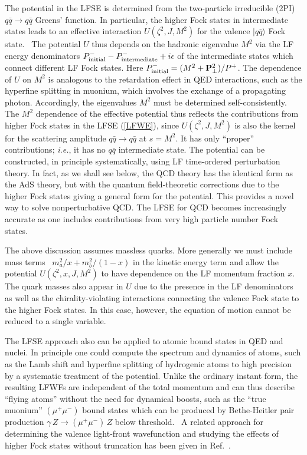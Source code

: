 \documentclass[prd,aps,onecolumn,nofootinbib]{revtex4}
\begin{document}
The potential in the LFSE is determined from the two-particle irreducible (2PI) $ q \bar q \to q \bar q $ Greens' function.  In particular, the higher Fock states in intermediate states
leads to an effective interaction $U(\zeta^2, J ,M^2)$  for the valence $\vert q \bar q \rangle$ Fock state.~\cite{Pauli:1998tf}
The potential $U$ thus depends on the hadronic eigenvalue $M^2$ via the LF energy denominators 
$P^-_{\rm initial} - P^-_{\rm intermediate} + i \epsilon$
of the intermediate states which connect different LF Fock states.  
Here $P^-_{\rm initial} =( {M^2 + \mathbf{P}^2_\perp)/ P^+}$. The dependence of $U$ on $M^2$ is analogous to the retardation effect in QED interactions, such as the hyperfine splitting in muonium, which involves the exchange of a propagating photon.  Accordingly, the eigenvalues $M^2$ must be determined 
self-consistently.~\cite{deTeramond:2012cs} 
The  $M^2$ dependence of the effective potential thus reflects the contributions from higher Fock states in the LFSE (\ref{LFWE}),  since
 $U(\zeta^2, J ,M^2)$ is also the kernel for the  scattering amplitude $q \bar q \to q \bar q$ at $s = M^2.$    It has only ``proper'' contributions; {\it i.e.}, it has no $q \bar q$ intermediate state.  The potential can be constructed, in principle systematically, using LF time-ordered perturbation theory.  In fact, as we shall see below, the QCD theory has the identical form as the AdS theory, but with the quantum field-theoretic corrections due to the higher Fock states giving a general form for the potential.  This provides a novel way to solve nonperturbative QCD.  The LFSE for QCD becomes increasingly accurate as one includes contributions from very high particle number Fock states. 

 
The above discussion assumes massless quarks. More generally we must include mass terms~\cite{Brodsky:2008pg,Gutsche:2011uj}
${m^2_a / x}  + {m^2_b/(1-x)}$ in the kinetic energy term and allow  the potential $  U(\zeta^2, x, J,M^2)$ to have dependence on the LF momentum fraction $x$.  The quark masses also appear in $U$ due to the  presence in the LF denominators as well as the chirality-violating interactions connecting the valence Fock state to the higher Fock states. In this case, however, the equation of motion cannot be reduced to a single variable.

The LFSE approach also can be applied to atomic bound states in QED and nuclei. In principle one could compute the spectrum and dynamics of atoms, such as the Lamb shift and hyperfine splitting of hydrogenic atoms to high precision by a systematic treatment of the potential. Unlike the ordinary  instant form, the resulting LFWFs are independent of the total momentum and can thus describe ``flying atoms'' without the need for dynamical boosts, 
such as the ``true muonium'' $(\mu^+ \mu^-)$ bound states which can be produced  by Bethe-Heitler pair production $\gamma \, Z \to (\mu^+ \mu^-)  \, Z$  below 
threshold.~\cite{Brodsky:2009gx} A related approach for determining the valence light-front wavefunction and studying the effects of higher Fock states without truncation 
has been given in Ref.~\cite{Chabysheva:2011ed}.
\end{document}
